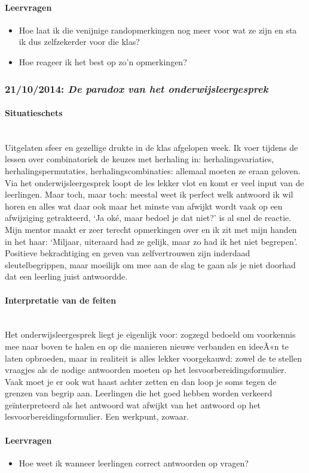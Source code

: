 \documentclass[a4paper,11pt]{article}
\newcommand{\tussen}[1]{\paragraph*{#1}\mbox{}\\}
\theoremstyle{definition}
\begin{document}
\paragraph*{Leervragen}
\begin{itemize}
  \item Hoe laat ik die venijnige randopmerkingen nog meer voor wat ze zijn en sta ik dus 
  zelfzekerder voor die klas?
  \item Hoe reageer ik het best op zo'n opmerkingen? \end{itemize}

\subsubsection{21/10/2014: \emph{De paradox van het onderwijsleergesprek}}
\tussen{Situatieschets}
Uitgelaten sfeer en gezellige drukte in de klas afgelopen week. Ik voer tijdens 
de lessen over combinatoriek de keuzes met herhaling in: herhalingsvariaties, 
herhalingspermutaties, herhalingscombinaties: allemaal moeten ze eraan geloven. Via het 
onderwijsleergesprek loopt de les lekker vlot en komt er veel input van de 
leerlingen. Maar toch, maar toch: meestal weet ik perfect welk antwoord ik wil 
horen en alles wat daar ook maar het minste van afwijkt wordt vaak op een 
afwijziging getrakteerd, `Ja oké, maar bedoel je dat niet?' is al snel de 
reactie. Mijn mentor maakt er zeer terecht opmerkingen over en ik zit met mijn 
handen in het haar: `Miljaar, uiteraard had ze gelijk, maar zo had ik het niet 
begrepen'. Positieve bekrachtiging en geven van zelfvertrouwen zijn inderdaad 
sleutelbegrippen, maar moeilijk om mee aan de slag te gaan als je niet doorhad dat een 
leerling juist antwoordde.
\tussen{Interpretatie van de feiten}
Het onderwijsleergesprek liegt je eigenlijk voor: zogzegd bedoeld om voorkennis mee naar boven te halen en op die manieren nieuwe verbanden en ideeÃ«n te laten opbroeden, 
maar in realiteit is alles lekker voorgekauwd: zowel de te stellen vraagjes als de nodige antwoorden moeten op het lesvoorbereidingsformulier. Vaak moet je er ook wat haast achter zetten en dan loop je soms tegen de grenzen van 
begrip aan. Leerlingen die het goed hebben worden verkeerd geïnterpreteerd als het antwoord wat afwijkt van het antwoord op het lesvoorbereidingsformulier. 
Een werkpunt, zowaar.
\paragraph*{Leervragen}
\begin{itemize}
  \item Hoe weet ik wanneer leerlingen correct antwoorden op vragen? \end{itemize}
  
\end{document}
